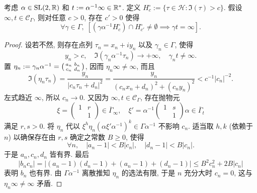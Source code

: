 \begin{lemma}\label{prop:horocycle-immersion-aux}
	考虑 $\alpha \in \operatorname{SL}(2,\mathbb{R})$ 和 $t := \alpha^{-1}\infty \in \mathbb{R}^*$. 定义 $H^\circ_c := \{\tau \in \mathcal{H}: \Im(\tau) > c \}$. 假设 $\infty, t \in \mathcal{C}_\Gamma$, 则对任意 $c > 0$, 存在 $c' > 0$ 使得
	\[ \forall \gamma \in \Gamma, \; \left[ (\gamma\alpha^{-1} H^\circ_c) \cap H^\circ_{c'} \neq \emptyset \implies \gamma t = \infty \right]. \]
\end{lemma}
\begin{proof}
	设若不然, 则存在点列 $\tau_n = x_n + iy_n$ 以及 $\gamma_n \in \Gamma$, 使得
	\[ y_n > c, \quad \Im\left(\gamma_n \alpha^{-1}\tau_n\right) \to +\infty, \quad \gamma_n t \neq \infty. \]
	置 $\eta_n := \gamma_n \alpha^{-1} = \bigl(\begin{smallmatrix} a_n & b_n \\ c_n & d_n \end{smallmatrix}\bigr)$, 因而 $\eta_n \infty \neq \infty$, 而且
	\[ \Im(\eta_n \tau_n) = \frac{y_n}{|c_n \tau_n + d_n|^2} = \frac{y_n}{(c_n x_n + d_n)^2 + (c_n y_n)^2} < c^{-1} |c_n|^{-2}. \]
	左式趋近 $\infty$, 所以 $c_n \to 0$. 又因为 $\infty, t \in \mathcal{C}_\Gamma$, 存在抛物元
	\[ \xi = \begin{pmatrix} 1 & r \\ & 1 \end{pmatrix} \in \overline{\Gamma}_\infty, \quad \xi' = \alpha^{-1} \begin{pmatrix} 1 & s \\ & 1 \end{pmatrix} \alpha \in \overline{\Gamma}_t \]
	满足 $r,s > 0$. 将 $\eta_n$ 代以 $\xi^h \eta_n (\alpha \xi' \alpha^{-1})^k \in \Gamma \alpha^{-1}$ 不影响 $c_n$. 适当取 $h, k$ (依赖于 $n$) 以确保存在由 $r, s$ 确定之常数 $B \geq 0$, 使得
	\[ \forall n, \quad |a_n - 1| < B|c_n|, \quad |d_n - 1| < B|c_n|. \]
	于是 $a_n, c_n, d_n$ 皆有界. 最后
	\[ |b_n c_n| = \left| (a_n - 1) (d_n - 1) + (a_n - 1) + (d_n - 1) \right| \leq B^2 c_n^2 + 2B|c_n| \]
	表明 $b_n$ 也有界. 由 $\Gamma \alpha^{-1}$ 离散推知 $\eta_n$ 的选法有限, 于是 $n$ 充分大时 $c_n = 0$, 这与 $\eta_n \infty \neq \infty$ 矛盾.
\end{proof}

